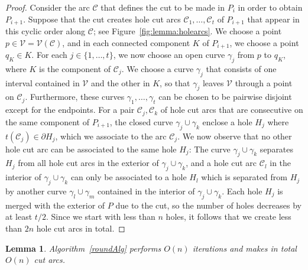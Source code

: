 \documentclass{article}
\newcommand{\PP}{P}
\newcommand{\KO}{K}
\newcommand{\VV}{\mathcal V}
\newcommand{\cut}{\mathcal C}
\newcommand{\terminal}{t}
\newtheorem{lemma}[theorem]{Lemma}
\begin{document}
\begin{proof}
Consider the arc $\cut$ that defines the cut to be made in $\PP_i$ in order to obtain $\PP_{i+1}$.
Suppose that the cut creates hole cut arcs $\cut_1,\ldots,\cut_t$ of $\PP_{i+1}$ that appear in this cyclic order along $\cut$; see Figure~\ref{fig:lemma:holearcs}.
We choose a point $p\in\VV=\VV(\cut)$, and in each connected component $\KO$ of $\PP_{i+1}$, we choose a point $q_{\KO}\in\KO$.
For each $j\in \{1,\ldots,t\}$, we now choose an open curve $\gamma_j$ from $p$ to $q_\KO$, where $\KO$ is the component of $\cut_j$.
We choose a curve $\gamma_j$ that consists of one interval contained in $\VV$ and the other in $\KO$, so that $\gamma_j$ leaves $\VV$ through a point on $\cut_j$.
Furthermore, these curves $\gamma_1,\ldots,\gamma_t$ can be chosen to be pairwise disjoint except for the endpoints.
For a pair $\cut_j,\cut_k$ of hole cut arcs that are consecutive on the same component of $\PP_{i+1}$, the closed curve $\gamma_j\cup \gamma_k$ enclose a hole $H_j$ where $\terminal(\cut_j)\in\partial H_j$, which we associate to the arc $\cut_j$.
We now observe that no other hole cut arc can be associated to the same hole $H_j$:
The curve $\gamma_j\cup \gamma_k$ separates $H_j$ from all hole cut arcs in the exterior of $\gamma_j\cup \gamma_k$, and a hole cut arc $\cut_l$ in the interior of $\gamma_j \cup \gamma_k$ can only be associated to a hole $H_l$ which is separated from $H_j$ by another curve $\gamma_l \cup \gamma_m$ contained in the interior of $\gamma_j \cup \gamma_k$.
Each hole $H_j$ is merged with the exterior of $\PP$ due to the cut, so the number of holes decreases by at least $t/2$.
Since we start with less than $n$ holes, it follows that we create less than $2n$ hole cut arcs in total.
\end{proof}


\begin{lemma}\label{linearIts}
Algorithm~\ref{roundAlg} performs $O(n)$ iterations and makes in total $O(n)$ cut arcs.
\end{lemma}
\end{document}
